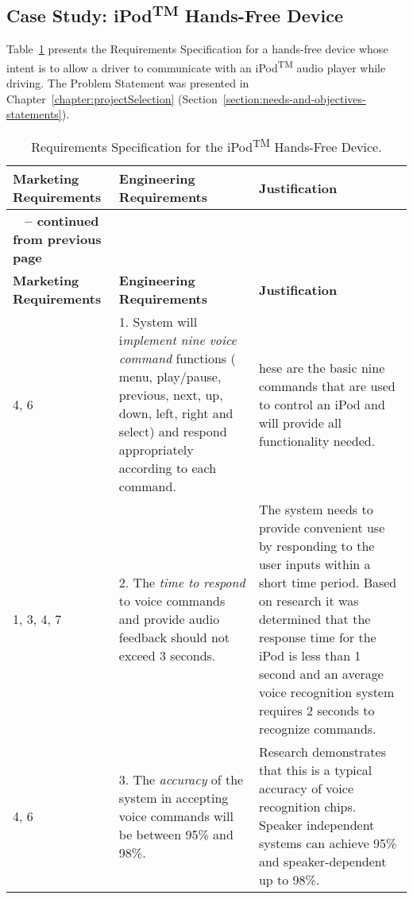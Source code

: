 \subsection{Case Study: iPod\textsuperscript{TM} Hands-Free Device}
\label{subsection:case-study-ipodtm-hands-free-device}

Table~\ref{table:ipod} presents the Requirements Specification for a hands-free
device whose intent is to allow a driver to communicate with an
iPod\textsuperscript{TM} audio player while driving. The Problem
Statement was presented in Chapter~\ref{chapter:projectSelection} 
(Section~\ref{section:needs-and-objectives-statements}).



\begin{longtable}{ |p{2.5cm}|p{5cm}|p{5.5cm}|} 
\caption{Requirements Specification for the iPod\textsuperscript{TM} Hands-Free Device.}
\label{table:ipod}\\

\hline
\rowcolor{Gray}
\textbf{Marketing Requirements} & \textbf{Engineering Requirements} & \textbf{Justification} \\ \hline
\endfirsthead

\hline
\rowcolor{Gray}
\multicolumn{3}{|c|}
{{\bfseries \tablename\ \thetable{} -- continued from previous page}} \\ \hline
\rowcolor{Gray}
\textbf{Marketing Requirements} & \textbf{Engineering Requirements} & \textbf{Justification} \\ \hline
\endhead
\endfoot

4, 6 & 
1.  System will i\emph{mplement nine voice command} functions ( menu,
  play/pause, previous, next, up, down, left, right and select) and
  respond appropriately according to each command. &
  hese are the basic nine commands that are used to
control an iPod and will provide all functionality needed. \\ \hline

1, 3, 4, 7 & 
2.   The \emph{time to respond} to voice commands and provide audio
  feedback should not exceed 3 seconds. &
The system needs to provide convenient use by
responding to the user inputs within a short time period. Based on
research it was determined that the response time for the iPod is less
than 1 second and an average voice recognition system requires 2 seconds
to recognize commands. \\ \hline

4, 6 & 
3.   The \emph{accuracy} of the system in accepting voice commands will be
  between 95\% and 98\%. &
Research demonstrates that this is a typical accuracy
of voice recognition chips. Speaker independent systems can achieve 95\%
and speaker-dependent up to 98\%. \\ \hline


\end{longtable}
